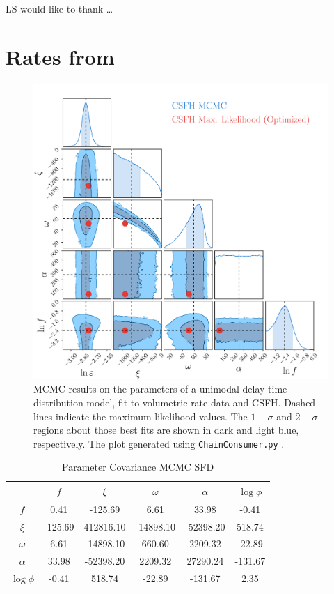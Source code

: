 \documentclass[apj]{aastex62}
\begin{document}
\acknowledgments LS would like to thank \ldots



\appendix
 \section{Rates from}\label{sec:mcmc_results}


\begin{figure}[t] %
   \centering
   \includegraphics[width=6.5in]{figure_sfd_corners} 
   \caption{\footnotesize MCMC results on the parameters of a unimodal delay-time distribution model, fit to volumetric rate data and CSFH. Dashed lines indicate the maximum likelihood values. The $1-\sigma$ and $2-\sigma$ regions about those best fits are shown in dark and light blue, respectively. The plot generated using {\tt ChainConsumer.py} \citep{Hinton:2016qy}.}
   \label{fig:mcmc_sfd}
\end{figure}
\clearpage

\begin{table}
    \centering
    \caption{Parameter Covariance MCMC SFD}
    \label{tab:parameter_covariance1}
    \begin{tabular}{c|ccccc}
         & $f$ & $\xi$ & $\omega$ & $\alpha$ & $\log \phi$\\ 
        \hline
              $f$ &  0.41 & -125.69 &  6.61 & 33.98 & -0.41 \\ 
            $\xi$ & -125.69 & 412816.10 & -14898.10 & -52398.20 & 518.74 \\ 
         $\omega$ &  6.61 & -14898.10 & 660.60 & 2209.32 & -22.89 \\ 
         $\alpha$ & 33.98 & -52398.20 & 2209.32 & 27290.24 & -131.67 \\ 
        $\log \phi$ & -0.41 & 518.74 & -22.89 & -131.67 &  2.35 \\ 
        \hline
    \end{tabular}
\end{table}
\end{document}
